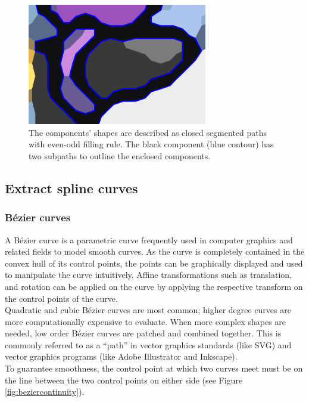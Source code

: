 \documentclass[]{usiinfbachelorproject}
\begin{document}
\begin{figure}[ht]
	\centering
	\includegraphics[width=0.7\textwidth]{img/holes.png}
	\caption{The components' shapes are described as closed segmented paths with even-odd filling rule. The black component (blue contour) has two subpaths to outline the enclosed components.}
	\label{fig:holes}
\end{figure}


\subsection{Extract spline curves}

\subsubsection{B\'ezier curves} \label{sec:bezier}

A B\'ezier curve is a parametric curve frequently used in computer graphics and related fields to model smooth curves. As the curve is completely contained in the convex hull of its control points, the points can be graphically displayed and used to manipulate the curve intuitively. Affine transformations such as translation, and rotation can be applied on the curve by applying the respective transform on the control points of the curve.\\
Quadratic and cubic B\'ezier curves are most common; higher degree curves are more computationally expensive to evaluate. When more complex shapes are needed, low order B\'ezier curves are patched and combined together. This is commonly referred to as a ``path'' in vector graphics standards (like SVG) and vector graphics programs (like Adobe Illustrator and Inkscape). \\
To guarantee smoothness, the control point at which two curves meet must be on the line between the two control points on either side (see Figure \ref{fig:beziercontinuity}).
\end{document}
